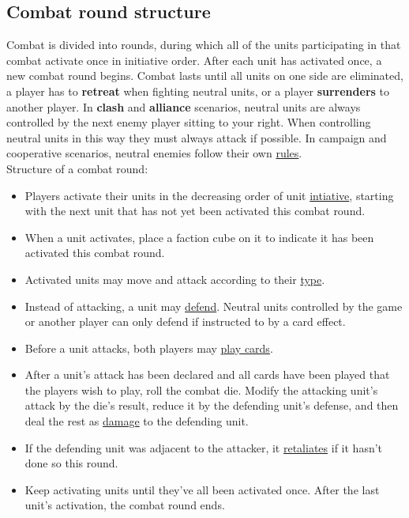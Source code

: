 \documentclass[12pt]{article}
\begin{document}
\subsection*{Combat round structure}
Combat is divided into rounds, during which all of the units participating in that combat activate once in initiative order. After each unit has activated once, a new combat round begins. Combat lasts until all units on one side are eliminated, a player has to \textbf{retreat} when fighting neutral units, or a player \textbf{surrenders} to another player. In \textbf{clash} and \textbf{alliance} scenarios, neutral units are always controlled by the next enemy player sitting to your right. When controlling neutral units in this way they must always attack if possible. In campaign and cooperative scenarios, neutral enemies follow their own \hyperlink{AIrules}{rules}.\\[6pt]
Structure of a combat round:
\begin{itemize}
    \item Players activate their units in the decreasing order of unit \hyperlink{Initiative}{intiative}, starting with the next unit that has not yet been activated this combat round.
    \item When a unit activates, place a faction cube on it to indicate it has been activated this combat round.
    \item Activated units may move and attack according to their \hyperlink{Unittype}{type}.
    \item Instead of attacking, a unit may \hyperlink{Defend}{defend}. Neutral units controlled by the game or another player can only defend if instructed to by a card effect.
    \item Before a unit attacks, both players may \hyperlink{CombatCards}{play cards}.
    \item After a unit's attack has been declared and all cards have been played that the players wish to play, roll the combat die. Modify the attacking unit's attack by the die's result, reduce it by the defending unit's defense, and then deal the rest as \hyperlink{HP}{damage} to the defending unit.
    \item If the defending unit was adjacent to the attacker, it \hyperlink{Retaliate}{retaliates} if it hasn't done so this round.
    \item Keep activating units until they've all been activated once. After the last unit's activation, the combat round ends.
\end{itemize}
\end{document}
